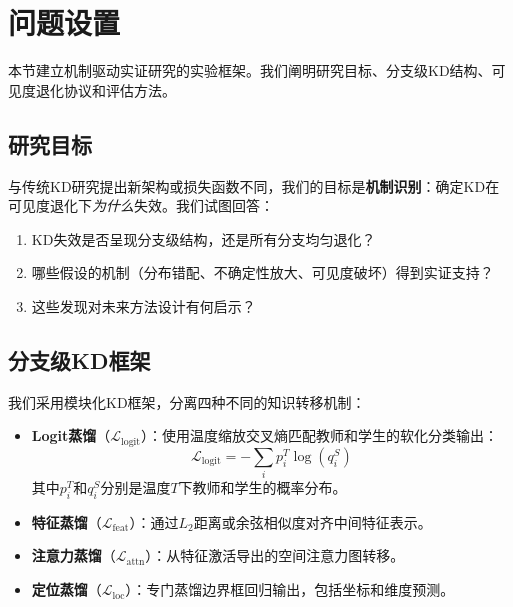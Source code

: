 \section{问题设置}
\label{sec:setup}

本节建立机制驱动实证研究的实验框架。我们阐明研究目标、分支级KD结构、可见度退化协议和评估方法。

\subsection{研究目标}

与传统KD研究提出新架构或损失函数不同，我们的目标是\textbf{机制识别}：确定KD在可见度退化下\emph{为什么}失效。我们试图回答：
\begin{enumerate}
    \item KD失效是否呈现分支级结构，还是所有分支均匀退化？
    \item 哪些假设的机制（分布错配、不确定性放大、可见度破坏）得到实证支持？
    \item 这些发现对未来方法设计有何启示？
\end{enumerate}

\subsection{分支级KD框架}

我们采用模块化KD框架，分离四种不同的知识转移机制：

\begin{itemize}
    \item \textbf{Logit蒸馏}（$\mathcal{L}_{\text{logit}}$）：使用温度缩放交叉熵匹配教师和学生的软化分类输出\cite{hinton2015distilling}：
    \begin{equation}
    \mathcal{L}_{\text{logit}} = -\sum_{i} p_i^T \log(q_i^S)
    \end{equation}
    其中$p_i^T$和$q_i^S$分别是温度$T$下教师和学生的概率分布。

    \item \textbf{特征蒸馏}（$\mathcal{L}_{\text{feat}}$）：通过$L_2$距离或余弦相似度对齐中间特征表示\cite{romero2014fitnets}。

    \item \textbf{注意力蒸馏}（$\mathcal{L}_{\text{attn}}$）：从特征激活导出的空间注意力图转移\cite{zagoruyko2016paying}。

    \item \textbf{定位蒸馏}（$\mathcal{L}_{\text{loc}}$）：专门蒸馏边界框回归输出，包括坐标和维度预测\cite{dai2021general}。
\end{itemize}

